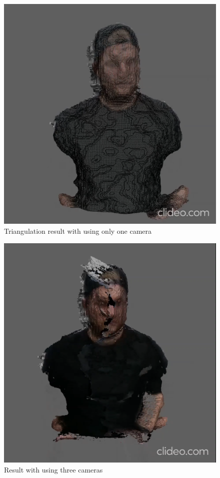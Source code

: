 \documentclass[10pt,twocolumn,letterpaper]{article}
\begin{document}
\begin{figure}[t]
\begin{center}
\includegraphics[width=0.65\linewidth]{imgs/res2}
\end{center}
 \caption{Triangulation result with using only one camera}
\end{figure}

\begin{figure}[t]
\begin{center}
\includegraphics[width=0.65\linewidth]{imgs/res3}
\end{center}
 \caption{Result with using three cameras}
\end{figure}
\end{document}
